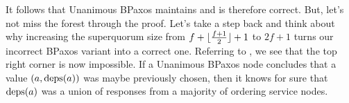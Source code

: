 It follows that Unanimous BPaxos maintains  and is
therefore correct. But, let's not miss the forest through the proof. Let's take
a step back and think about why increasing the superquorum size from $f +
\lfloor\frac{f+1}{2}\rfloor + 1$ to $2f+1$ turns our incorrect BPaxos variant into a
correct one. Referring to , we see that the top right
corner is now impossible. If a Unanimous BPaxos node concludes that a value
$(a, \text{deps}(a))$ was maybe previously chosen, then it knows for sure that
$\text{deps}(a)$ was a union of responses from a majority of ordering service nodes.


